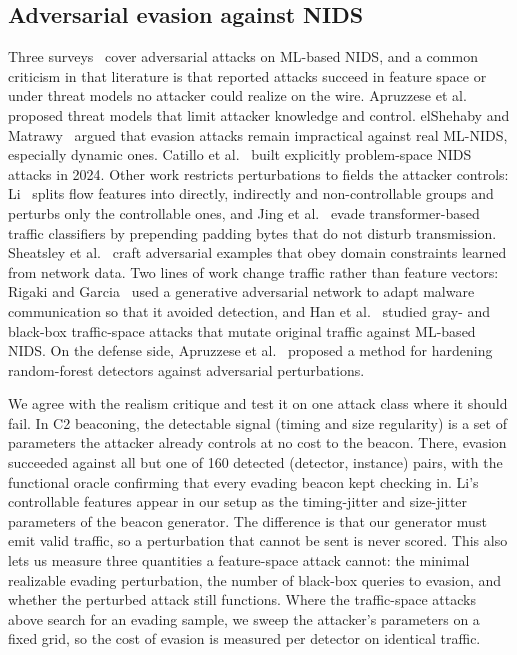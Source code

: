 \documentclass[preprint,12pt]{elsarticle}
\begin{document}
\subsection{Adversarial evasion against NIDS}
Three surveys~\cite{nids_survey2023,ennaji2024,nids_understanding2026} cover adversarial attacks on
ML-based NIDS, and a common criticism in that literature is that reported attacks succeed in feature
space or under threat models no attacker could realize on the wire. Apruzzese et
al.~\cite{apruzzese2022} proposed threat models that limit attacker knowledge and control.
elShehaby and Matrawy~\cite{elshehaby2023} argued that evasion attacks remain impractical against real
ML-NIDS, especially dynamic ones. Catillo et al.~\cite{catillo2024} built explicitly problem-space NIDS
attacks in 2024. Other work restricts perturbations to fields the attacker controls: Li~\cite{li2026}
splits flow features into directly, indirectly and non-controllable groups and perturbs only the
controllable ones, and Jing et al.~\cite{jing2025} evade transformer-based traffic classifiers by
prepending padding bytes that do not disturb transmission. Sheatsley et al.~\cite{sheatsley2022} craft
adversarial examples that obey domain constraints learned from network data. Two lines of work change
traffic rather than feature vectors: Rigaki and Garcia~\cite{rigaki2018} used a generative adversarial
network to adapt malware communication so that it avoided detection, and Han et al.~\cite{han2021}
studied gray- and black-box traffic-space attacks that mutate original traffic against ML-based NIDS.
On the defense side, Apruzzese et al.~\cite{apruzzese2020rf} proposed a method for hardening
random-forest detectors against adversarial perturbations.

We agree with the realism critique and test it on one attack class where it should fail. In C2
beaconing, the detectable signal (timing and size regularity) is a set of parameters the attacker
already controls at no cost to the beacon. There, evasion succeeded against all but one of 160
detected (detector, instance) pairs, with the functional oracle confirming that every evading beacon
kept checking in. Li's controllable features appear in our setup as the timing-jitter and size-jitter
parameters of the beacon generator. The difference is that our generator must emit valid traffic, so
a perturbation that cannot be sent is never scored. This also lets us measure three quantities a
feature-space attack cannot: the minimal realizable evading perturbation, the number of black-box
queries to evasion, and whether the perturbed attack still functions. Where the traffic-space attacks
above search for an evading sample, we sweep the attacker's parameters on a fixed grid, so the cost of
evasion is measured per detector on identical traffic.
\end{document}
